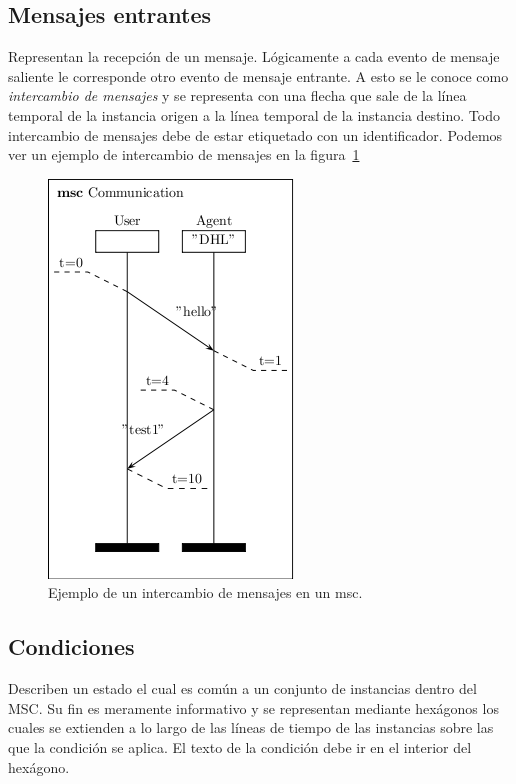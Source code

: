 \subsection*{Mensajes entrantes}
Representan la recepción de un mensaje. Lógicamente a cada evento de
mensaje saliente le corresponde otro evento de mensaje entrante. A
esto se le conoce como \textit{intercambio de mensajes} y se representa con una
flecha que sale de la línea temporal de la instancia origen a la
línea temporal de la instancia destino. Todo intercambio de mensajes
debe de estar etiquetado con un identificador. Podemos ver un ejemplo
de intercambio de mensajes en la figura~\ref{fig:message_exchange}

\begin{figure}
  \centering
  \includegraphics[scale=1]{./images/message exchange.png}
  \caption{Ejemplo de un intercambio de mensajes en un msc.}
  \label{fig:message_exchange}
\end{figure}

\subsection*{Condiciones}
Describen un estado el cual es común a un conjunto de instancias
dentro del MSC. Su fin es meramente informativo y se representan
mediante hexágonos los cuales se extienden a lo largo de las líneas de
tiempo de las instancias sobre las que la condición se aplica. El
texto de la condición debe ir en el interior del hexágono.


